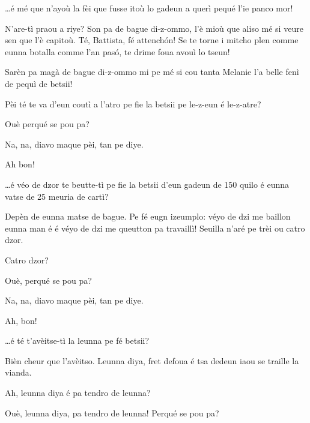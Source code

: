 \begin{drama}
\Battistaspeaks  \ldots é mé que n’ayoù la fèi que fusse itoù lo gadeun a querì pequé l’ie panco mor!


\Germenespeaks N’are-tì praou a riye? Son pa de bague di-z-ommo, l'è mioù que aliso mé si veure sen que l’è capitoù. Té, Battista, fé attench\'on! Se te torne i mitcho plen comme eunna botalla comme l'an pas\'o, te drime foua avouì lo tseun! 


\Battistaspeaks  Sarèn pa magà de bague di-z-ommo mi pe mé si cou tanta Melanie l’a belle fenì de pequì de betsii! 


\Battistaspeaks  {}Pèi té te va d’eun coutì a l’atro pe fie la betsii pe le-z-eun é le-z-atre?

\Hermannspeaks {} Ouè perqué se pou pa?

\Battistaspeaks{}  Na, na, diavo maque pèi, tan pe diye.

\Hermannspeaks Ah bon!

\Battistaspeaks  {} \ldots é véo de dzor te beutte-tì pe fie la betsii d’eun gadeun de 150 quilo é eunna vatse de 25 meuria de cartì?

\Hermannspeaks Depèn de eunna matse de bague. Pe fé eugn izeumplo: véyo de dzi me baillon eunna man é  é véyo de dzi me queutton pa travaillì! Seuilla n'aré pe trèi ou catro dzor.

\Battistaspeaks  Catro dzor?

\Hermannspeaks{} Ouè, perqué se pou pa?

\Battistaspeaks{}  Na, na, diavo maque pèi, tan pe diye.

\Hermannspeaks Ah, bon!

\Battistaspeaks{}\ldots é té t’avèitse-tì la leunna pe fé betsii?

\Hermannspeaks Bièn cheur que l’avèitso. Leunna diya, fret defoua é tsa dedeun iaou se traille la vianda. 

\Battistaspeaks Ah, leunna diya é pa tendro de leunna?

\Hermannspeaks {} Ouè, leunna diya, pa tendro de leunna! Perqué se pou pa?


\end{drama}
